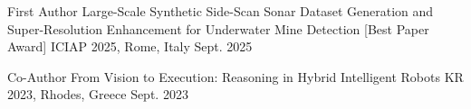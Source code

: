 
\begin{cventries}

  \cventry
    {First Author} %
    {Large-Scale Synthetic Side-Scan Sonar Dataset Generation and Super-Resolution Enhancement for Underwater Mine Detection [Best Paper Award]} %
    {ICIAP 2025, Rome, Italy} %
    {Sept. 2025} %
    {
    }


\cventry
    {Co-Author} %
    {From Vision to Execution: Reasoning in Hybrid Intelligent Robots} %
    {KR 2023, Rhodes, Greece} %
    {Sept. 2023} %
    {
    }


\end{cventries}
